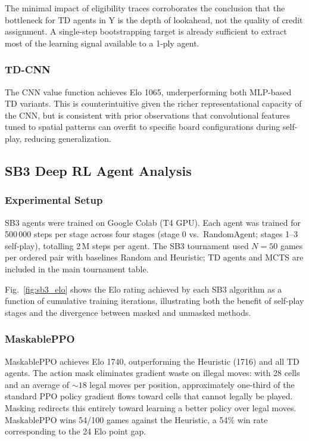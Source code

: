 \documentclass[conference]{IEEEtran}
\begin{document}
The minimal impact of eligibility traces corroborates the conclusion that the
bottleneck for TD agents in Y is the depth of lookahead, not the quality of
credit assignment. A single-step bootstrapping target is already sufficient to
extract most of the learning signal available to a 1-ply agent.

\subsubsection{TD-CNN}
The CNN value function achieves Elo 1065, underperforming both MLP-based TD
variants. This is counterintuitive given the richer representational capacity of
the CNN, but is consistent with prior observations that convolutional features
tuned to spatial patterns can overfit to specific board configurations during
self-play, reducing generalization.

\subsection{SB3 Deep RL Agent Analysis}
\label{sec:sb3results}

\subsubsection{Experimental Setup}
SB3 agents were trained on Google Colab (T4 GPU). Each agent was trained for 500\,000 steps per
stage across four stages (stage 0 vs.\ RandomAgent; stages 1--3 self-play),
totalling 2\,M steps per agent. The SB3 tournament used $N = 50$ games per
ordered pair with baselines Random and Heuristic; TD agents and MCTS are included
in the main tournament table.

Fig.~\ref{fig:sb3_elo} shows the Elo rating achieved by each SB3 algorithm as a
function of cumulative training iterations, illustrating both the benefit of
self-play stages and the divergence between masked and unmasked methods.

\subsubsection{MaskablePPO}
MaskablePPO achieves Elo 1740, outperforming the Heuristic (1716) and all TD
agents. The action mask eliminates gradient waste on illegal moves: with 28 cells
and an average of $\sim\!18$ legal moves per position, approximately one-third
of the standard PPO policy gradient flows toward cells that cannot legally be
played. Masking redirects this entirely toward learning a better policy over legal
moves. MaskablePPO wins 54/100 games against the Heuristic, a 54\% win rate
corresponding to the 24 Elo point gap.
\end{document}
